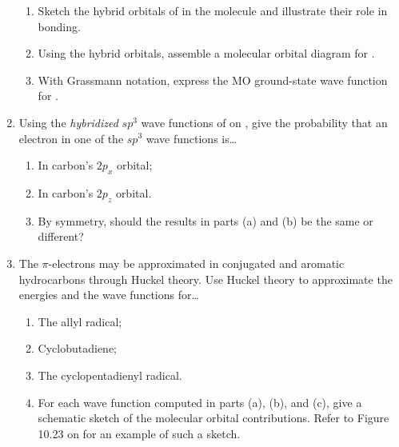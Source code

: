 \documentclass[../psets.tex]{subfiles}
\begin{document}
\begin{enumerate}
    \begin{enumerate}
        \item Sketch the hybrid orbitals of  in the molecule  and illustrate their role in bonding.
        \item Using the hybrid orbitals, assemble a molecular orbital diagram for .
        \item With Grassmann notation, express the MO ground-state wave function for .
    \end{enumerate}
    \item Using the \emph{hybridized} $sp^3$ wave functions of  on \textcite[376]{bib:McQuarrieSimon}, give the probability that an electron in one of the $sp^3$ wave functions is\dots
    \begin{enumerate}
        \item In carbon's $2p_x$ orbital;
        \item In carbon's $2p_z$ orbital.
        \item By symmetry, should the results in parts (a) and (b) be the same or different?
    \end{enumerate}
    \item The $\pi$-electrons may be approximated in conjugated and aromatic hydrocarbons through Huckel theory. Use Huckel theory to approximate the energies and the wave functions for\dots
    \begin{enumerate}
        \item The allyl radical;
        \item Cyclobutadiene;
        \item The cyclopentadienyl radical.
        \item For each wave function computed in parts (a), (b), and (c), give a schematic sketch of the molecular orbital contributions. Refer to Figure 10.23 on \textcite[396]{bib:McQuarrieSimon} for an example of such a sketch.
    \end{enumerate}
\end{enumerate}
\end{document}
